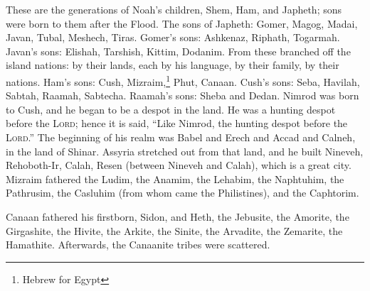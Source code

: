 
\begin{inparaenum}
     These are the generations of Noah's children, Shem, Ham, and Japheth; sons were born to them after the Flood.%
     The sons of Japheth: Gomer, Magog, Madai, Javan, Tubal, Meshech, Tiras.%
     Gomer's sons: Ashkenaz, Riphath, Togarmah.%
     Javan's sons: Elishah, Tarshish, Kittim, Dodanim.%
     From these branched off the island nations: by their lands, each by his language, by their family, by their nations.%
     Ham's sons: Cush, Mizraim,\footnote{Hebrew for Egypt} Phut, Canaan.%
     Cush's sons: Seba, Havilah, Sabtah, Raamah, Sabtecha. Raamah's sons: Sheba and Dedan.%
     Nimrod was born to Cush, and he began to be a despot in the land.%
     He was a hunting despot before the \textsc{Lord}; hence it is said, ``Like Nimrod, the hunting despot before the \textsc{Lord}.''%
     The beginning of his realm was Babel and Erech and Accad and Calneh, in the land of Shinar.%
     Assyria stretched out from that land, and he built Nineveh, Rehoboth-Ir, Calah,%
     Resen (between Nineveh and Calah), which is a great city.%
     Mizraim fathered the Ludim, the Anamim, the Lehabim, the Naphtuhim,%
     the Pathrusim, the Casluhim (from whom came the Philistines), and the Caphtorim.%
    
     Canaan fathered his firstborn, Sidon, and Heth,%
     the Jebusite, the Amorite, the Girgashite,%
     the Hivite, the Arkite, the Sinite,%
     the Arvadite, the Zemarite, the Hamathite. Afterwards, the Canaanite tribes were scattered.%
    
\end{inparaenum}

